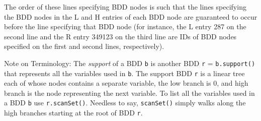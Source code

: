 The order of these lines specifying BDD nodes is such that the lines specifying
the BDD nodes in the L and H entries
of each BDD node are guaranteed to occur before the line specifying that BDD
node (for instance, the L entry 287 on
the second line and the R entry 349123 on the third line are IDs of BDD nodes
specified on the first and second lines,
respectively).

Note on Terminology:
The {\it support} of a BDD {\tt b} is another BDD {\tt r} = {\tt b.support()}
that represents all the variables used in {\tt b}.
The support BDD {\tt r} is a linear tree each of whose nodes contains a separate
variable,
the low branch is 0, and high branch is the node representing the next variable.
To list all the variables used in a BDD {\tt b} use {\tt r.scanSet()}.
Needless to say, {\tt scanSet()} simply walks along the high branches
starting at the root of BDD {\tt r}.

